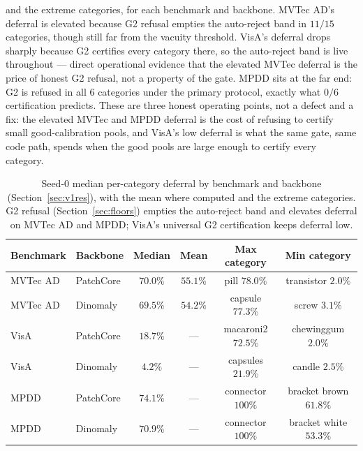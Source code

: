 \documentclass[11pt]{article}
\begin{document}
and the extreme categories, for each benchmark and backbone. MVTec AD's deferral is elevated
because G2 refusal empties the auto-reject band in $11/15$ categories, though still far from the
vacuity threshold. VisA's deferral drops sharply because G2 certifies every category there, so the
auto-reject band is live throughout --- direct operational evidence that the elevated MVTec
deferral is the price of honest G2 refusal, not a property of the gate. MPDD sits at the far end:
G2 is refused in all $6$ categories under the primary protocol, exactly what $0/6$ certification
predicts. These are three honest operating points, not a defect and a fix: the elevated MVTec and
MPDD deferral is the cost of refusing to certify small good-calibration pools, and VisA's low
deferral is what the same gate, same code path, spends when the good pools are large enough to
certify every category.

\begin{table}[H]
  \centering
  \small
  \caption{Seed-$0$ median per-category deferral by benchmark and backbone
  (Section~\ref{sec:v1res}), with the mean where computed and the extreme categories. G2 refusal
  (Section~\ref{sec:floors}) empties the auto-reject band and elevates deferral on MVTec AD and
  MPDD; VisA's universal G2 certification keeps deferral low.}
  \label{tab:deferral}
  \begin{tabular}{llcccc}
    \toprule
    Benchmark & Backbone & Median & Mean & Max category & Min category \\
    \midrule
    MVTec AD & PatchCore & $70.0\%$ & $55.1\%$ & pill $78.0\%$ & transistor $2.0\%$ \\
    MVTec AD & Dinomaly  & $69.5\%$ & $54.2\%$ & capsule $77.3\%$ & screw $3.1\%$ \\
    VisA     & PatchCore & $18.7\%$ & ---      & macaroni2 $72.5\%$ & chewinggum $2.0\%$ \\
    VisA     & Dinomaly  & $4.2\%$  & ---      & capsules $21.9\%$ & candle $2.5\%$ \\
    MPDD     & PatchCore & $74.1\%$ & ---      & connector $100\%$ & bracket brown $61.8\%$ \\
    MPDD     & Dinomaly  & $70.9\%$ & ---      & connector $100\%$ & bracket white $53.3\%$ \\
    \bottomrule
  \end{tabular}
\end{table}
\FloatBarrier
\end{document}
